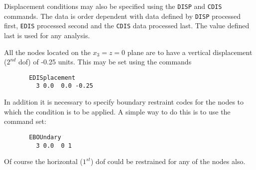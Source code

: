 Displacement conditions may also be specified using the {\tt DISP}
and {\tt CDIS} commands.
The data is order dependent with data
defined by {\tt DISP} processed first, {\tt EDIS} processed second and
the {\tt CDIS} data processed last.  The value defined last is used for
any analysis.
\pagebreak


All the nodes located on the $x_3 = z = 0$ plane are to have a vertical
displacement ($2^{nd}$ dof) of -0.25 units.  This may be set using the commands
\begin{verbatim}
       EDISplacement
         3 0.0  0.0 -0.25
\end{verbatim}
In addition it is necessary to specify boundary restraint codes for the nodes
to which the condition is to be applied.  A simple way to do this is to use
the command set:
\begin{verbatim}
       EBOUndary
         3 0.0  0 1
\end{verbatim}
Of course the horizontal ($1^{st}$) dof could be restrained for any
of the nodes also.
\vfil\eject
